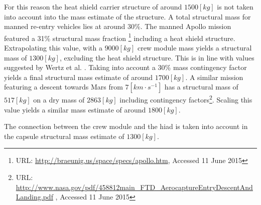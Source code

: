 For this reason the heat shield carrier structure of around $1500 \left[kg\right]$ \cite{Ainsworth2014} is not taken into account into the mass estimate of the structure. A total structural mass for manned re-entry vehicles lies at around 30\%. The manned Apollo mission featured a 31\% structural mass fraction \footnote{URL: \url{http://braeunig.us/space/specs/apollo.htm}, Accessed 11 June 2015} including a heat shield structure. Extrapolating this value, with a $9000 \left[kg\right]$ crew module mass yields a structural mass of $1300 \left[kg\right]$, excluding the heat shield structure. This is in line with values suggested by Wertz et al. \cite{Wertz2011}. Taking into account a 30\% mass contingency factor yields a final structural mass estimate of around $1700 \left[kg\right]$. A similar mission featuring a descent towards Mars from $7 \left[km \cdot s^{-1}\right]$ has a structural mass of $517 \left[kg\right]$ on a dry mass of $2863 \left[kg\right]$ including contingency factors\footnote{URL: \url{http://www.nasa.gov/pdf/458812main\_FTD\_AerocaptureEntryDescentAndLanding.pdf} , Accessed 11 June 2015 }. Scaling this value yields a similar mass estimate of around $1800 \left[kg\right]$. 

The connection between the crew module and the \gls{hiad} is taken into account in the capsule structural mass estimate of $1300 \left[kg\right]$.